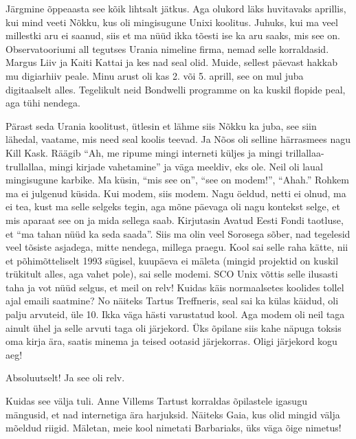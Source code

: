 Järgmine õppeaasta see kõik lihtsalt jätkus. Aga olukord läks huvitavaks 
aprillis, kui mind veeti Nõkku, kus oli mingisugune Unixi 
koolitus. Juhuks, kui ma veel millestki aru ei saanud, siis et ma nüüd ikka 
tõesti ise ka aru saaks, mis see on. Observatooriumi all tegutses Urania nimeline firma, nemad selle 
korraldasid. Margus Liiv ja  Kaiti 
Kattai ja kes nad seal olid. Muide, sellest päevast 
hakkab mu digiarhiiv peale.  Minu  arust oli kas 2. või 5. aprill, see on mul 
juba digitaalselt alles. Tegelikult neid Bondwelli programme on ka kuskil 
flopide peal, aga tühi nendega. 

Pärast seda Urania  koolitust,  ütlesin et lähme siis Nõkku 
ka juba, see siin lähedal, vaatame, mis need seal koolis teevad. Ja Nõos oli 
selline härrasmees nagu Kill Kask. Räägib \enquote{Ah, me ripume mingi interneti küljes ja 
mingi trillallaa-trullallaa, mingi kirjade vahetamine} ja väga meeldiv, eks 
ole. Neil oli laual mingisugune karbike. Ma küsin, \enquote{mis see on}, 
\enquote{see on modem!}, \enquote{Ahah.} Rohkem ma ei julgenud küsida. Kui 
modem, siis modem. Nagu öeldud, netti ei olnud, ma ei tea, kust ma selle 
selgeks tegin, aga mõne päevaga oli nagu kontekst selge, et mis aparaat see on 
ja mida sellega saab. Kirjutasin Avatud Eesti Fondi 
taotluse, et \enquote{ma tahan nüüd ka seda saada}. Siis ma olin veel Sorosega 
sõber, nad tegelesid veel tõsiste asjadega, mitte nendega, millega praegu. Kool 
sai selle raha kätte, nii et põhimõtteliselt 1993 sügisel, kuupäeva ei mäleta 
(mingid projektid on kuskil trükitult alles, aga vahet pole), sai selle modemi. 
SCO Unix võttis selle ilusasti taha ja vot nüüd selgus, et meil 
on relv! Kuidas käis normaalsetes koolides tollel ajal emaili saatmine? No 
näiteks Tartus Treffneris, seal sai ka külas 
käidud,  oli palju arvuteid, üle 10. Ikka väga hästi varustatud kool. Aga modem 
oli neil taga ainult ühel ja selle arvuti taga oli järjekord. Üks õpilane siis 
kahe näpuga toksis oma kirja ära, saatis minema ja teised ootasid järjekorras. 
Oligi järjekord kogu aeg! 


Absoluutselt! Ja see oli relv. 

Kuidas see välja tuli. Anne Villems Tartust korraldas 
õpilastele igasugu mängusid, et nad internetiga  ära harjuksid. Näiteks Gaia, 
kus olid mingid välja mõeldud riigid. Mäletan, meie kool nimetati Barbariaks, 
üks väga õige nimetus! 

